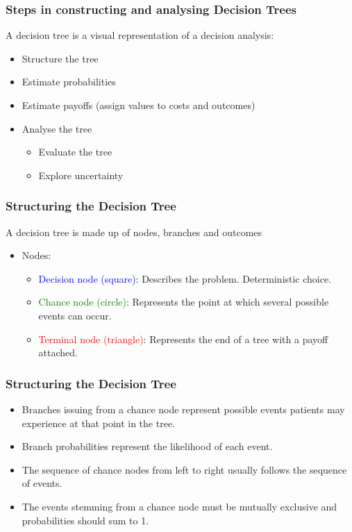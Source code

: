 \documentclass[t]{beamer}
\begin{document}
\begin{frame}
\frametitle{Steps in constructing and analysing Decision Trees}
A decision tree is a visual representation of a decision analysis:
	\begin{itemize}
		\item \alert{Structure} the tree
		\pause
		\item Estimate \alert{probabilities}
		\pause
		\item Estimate \alert{payoffs} (assign values to costs and outcomes)
		\pause
		\item Analyse the tree
		\pause
			\begin{itemize}
				\item \alert{Evaluate} the tree
				\item Explore \alert{uncertainty}
			\end{itemize}
	\end{itemize}
\end{frame}

\begin{frame}
\frametitle{Structuring the Decision Tree}
A decision tree is made up of nodes, branches and outcomes

	\begin{itemize}
		\item Nodes:
	\begin{itemize}
		\pause
		\item \textcolor{blue}{Decision node (square)}: Describes the problem. Deterministic choice.
		\pause
		\item \textcolor{green}{Chance node (circle)}: Represents the point at which several possible events can occur.
		\pause
		\item \textcolor{red}{Terminal node (triangle)}: Represents the end of a tree with a payoff attached.
	\end{itemize}
		\end{itemize}
\end{frame}


	\begin{frame}
\frametitle{Structuring the Decision Tree}
	\begin{itemize}
		\item Branches issuing from a chance node represent possible events patients may experience at that point in the tree.
		\item Branch probabilities represent the likelihood of each event.
		\item The sequence of chance nodes from left to right usually follows the sequence of events.
		\item The events stemming from a chance node must be \alert{mutually exclusive} and probabilities should sum to 1.
	\end{itemize}
\end{frame}
\end{document}
